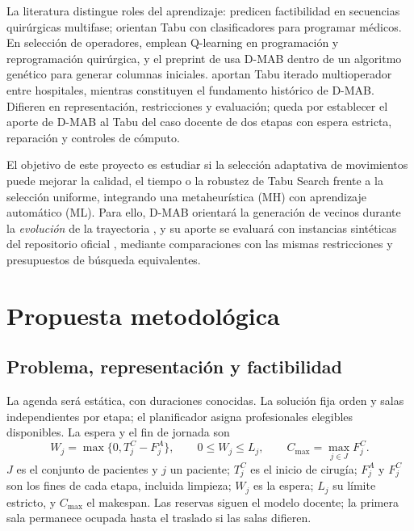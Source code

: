 \documentclass[12pt,letterpaper]{report}
\begin{document}
La literatura distingue roles del aprendizaje: \textcite{akbarzadeh2024}
predicen factibilidad en secuencias quirúrgicas multifase;
\textcite{niroumandrad2024} orientan Tabu con clasificadores para programar
médicos. En selección de operadores, \textcite{yu2024} emplean Q-learning
en programación y reprogramación quirúrgica, y el preprint de
\textcite{dolatkhah2026} usa D-MAB dentro de un algoritmo genético para
generar columnas iniciales. \textcite{yin2026} aportan Tabu iterado
multioperador entre hospitales, mientras \textcite{dacosta2008} constituyen
el fundamento histórico de D-MAB. Difieren en representación, restricciones
y evaluación; queda por establecer el aporte de D-MAB al Tabu del caso
docente de dos etapas con espera estricta, reparación y controles de cómputo.

El objetivo de este proyecto es estudiar si la selección adaptativa de
movimientos puede mejorar la calidad, el tiempo o la robustez de Tabu Search
frente a la selección uniforme, integrando una metaheurística (MH) con
aprendizaje automático (ML). Para ello, D-MAB orientará la generación de
vecinos durante la \emph{evolución} de la trayectoria
\parencite{vega_taxonomia}, y su aporte se evaluará con instancias sintéticas
del repositorio oficial \parencite{saicooh2026}, mediante comparaciones con
las mismas restricciones y presupuestos de búsqueda equivalentes.

\clearpage
\section{Propuesta metodológica}
\subsection{Problema, representación y factibilidad}
La agenda será estática, con duraciones conocidas. La solución fija orden
y salas independientes por etapa; el planificador asigna profesionales
elegibles disponibles. La espera y el fin de jornada son
\begin{equation}
 W_j=\max\{0,T_j^C-F_j^A\},\qquad 0\leq W_j\leq L_j,
 \qquad C_{\max}=\max_{j\in J}F_j^C.
 \label{eq:restricciones}
\end{equation}
\noindent $J$ es el conjunto de pacientes y $j$ un paciente; $T_j^C$ es el
inicio de cirugía; $F_j^A$ y $F_j^C$ son los fines de cada etapa, incluida
limpieza; $W_j$ es la espera; $L_j$ su límite estricto, y $C_{\max}$ el
makespan. Las reservas siguen el modelo docente; la primera sala permanece
ocupada hasta el traslado si las salas difieren.
\end{document}
